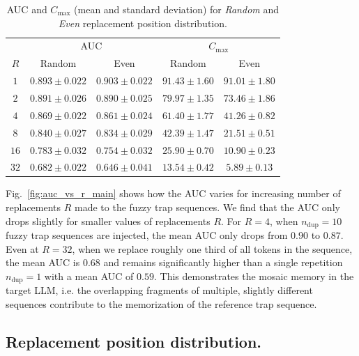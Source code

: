 \begin{table}[ht]
    \centering
    \begin{tabular}{ccc|cc}
    \toprule
         & \multicolumn{2}{c}{AUC} & \multicolumn{2}{c}{$C_\text{max}$} \\
        $R$ & Random & Even & Random & Even\\
        \midrule
        $1$ & $0.893 \pm 0.022$ & $0.903 \pm 0.022$ & $91.43 \pm 1.60$ & $91.01 \pm 1.80$ \\ 
        \cmidrule{1-5}
        $2$ & $0.891 \pm 0.026$ & $0.890 \pm 0.025$ & $79.97 \pm 1.35$ & $73.46 \pm 1.86$ \\ 
        \cmidrule{1-5}
        $4$ & $0.869 \pm 0.022$ & $0.861 \pm 0.024$ & $61.40 \pm 1.77$ & $41.26 \pm 0.82$ \\ 
         \cmidrule{1-5}
        $8$ & $0.840 \pm 0.027$ & $0.834 \pm 0.029$ & $42.39 \pm 1.47$ & $21.51 \pm 0.51$ \\  
         \cmidrule{1-5}
        $16$ & $0.783 \pm 0.032$ & $0.754 \pm 0.032$ & $25.90 \pm 0.70$ & $10.90 \pm 0.23$ \\ 
         \cmidrule{1-5}
        $32$ & $0.682 \pm 0.022$ & $0.646 \pm 0.041$ & $13.54 \pm 0.42$ & $5.89 \pm 0.13$ \\ 
         \bottomrule
    \end{tabular}
    \caption{AUC and $C_\text{max}$ (mean and standard deviation) for \emph{Random} and \emph{Even} replacement position distribution.}
    \label{tab:uniform_vs_random_distr}
\end{table}

Fig.~\ref{fig:auc_vs_r_main} shows how the AUC varies for increasing number of replacements $R$ made to the fuzzy trap sequences. We find that the AUC only drops slightly for smaller values of replacements $R$. For $R=4$, when $n_{\text{dup}}=10$ fuzzy trap sequences are injected, the mean AUC only drops from $0.90$ to $0.87$. Even at $R=32$, when we replace roughly one third of all tokens in the sequence, the mean AUC is $0.68$ and remains significantly higher than a single repetition $n_{\text{dup}}=1$ with a mean AUC of $0.59$. This demonstrates the mosaic memory in the target LLM, i.e. the overlapping fragments of multiple, slightly different sequences contribute to the memorization of the reference trap sequence.

\subsection{Replacement position distribution.} \label{section:spread_replacements}

